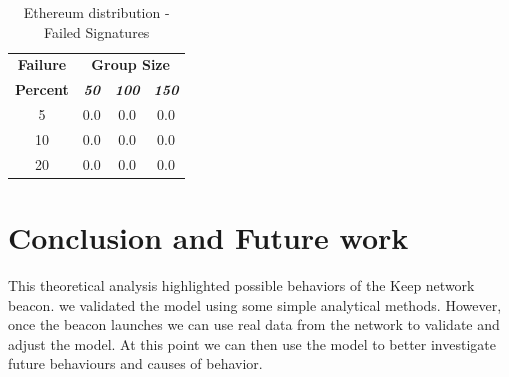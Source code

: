 \documentclass[conference]{IEEEtran}
\begin{document}
        \begin{table}[h!]
            \caption{Ethereum distribution - Failed Signatures}
            \begin{center}
            \begin{tabular}{|c|c|c|c|}
            \hline
            \textbf{Failure}&\multicolumn{3}{|c|}{\textbf{Group Size}} \\
            \cline{2-4} 
            \textbf{Percent} & \textbf{\textit{50}}& \textbf{\textit{100}}& \textbf{\textit{150}} \\
            \hline
            5 &  0.0 &  0.0 &  0.0 \\
            \hline
            10 &  0.0 &  0.0 &  0.0 \\
            \hline
            20 &  0.0 &  0.0 &  0.0 \\
            \hline
            \end{tabular}
            \label{failed_table2}
            \end{center}
        \end{table}


\newpage
\section{Conclusion and Future work}
This theoretical analysis highlighted possible behaviors of the Keep network beacon. we
validated the model using some simple analytical methods. However, once the beacon launches
we can use real data from the network to validate and adjust the model. At this point we can
then use the model to better investigate future behaviours and causes of behavior. 




\end{document}
